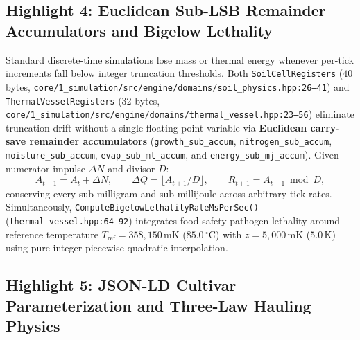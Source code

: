 \subsection{Highlight 4: Euclidean Sub-LSB Remainder Accumulators and Bigelow Lethality}

Standard discrete-time simulations lose mass or thermal energy whenever per-tick increments fall below integer truncation thresholds. Both \texttt{SoilCellRegisters} ($40$ bytes, \texttt{core/1\_simulation/src/engine/domains/soil\_physics.hpp:26--41}) and \texttt{ThermalVesselRegisters} ($32$ bytes, \texttt{core/1\_simulation/src/engine/domains/thermal\_vessel.hpp:23--56}) eliminate truncation drift without a single floating-point variable via \textbf{Euclidean carry-save remainder accumulators} (\texttt{growth\_sub\_accum}, \texttt{nitrogen\_sub\_accum}, \texttt{moisture\_sub\_accum}, \texttt{evap\_sub\_ml\_accum}, and \texttt{energy\_sub\_mj\_accum}). Given numerator impulse $\Delta N$ and divisor $D$:
\[
  A_{t+1} = A_t + \Delta N, \qquad \Delta Q = \lfloor A_{t+1} / D \rfloor, \qquad R_{t+1} = A_{t+1} \bmod D,
\]
conserving every sub-milligram and sub-millijoule across arbitrary tick rates. Simultaneously, \texttt{ComputeBigelowLethalityRateMsPerSec()} (\texttt{thermal\_vessel.hpp:64--92}) integrates food-safety pathogen lethality \parencite{bigelow1921thermal} around reference temperature $T_{\text{ref}} = 358{,}150\,\text{mK}$ ($85.0\,^\circ\text{C}$) with $z = 5{,}000\,\text{mK}$ ($5.0\,\text{K}$) using pure integer piecewise-quadratic interpolation.

\subsection{Highlight 5: JSON-LD Cultivar Parameterization and Three-Law Hauling Physics}

